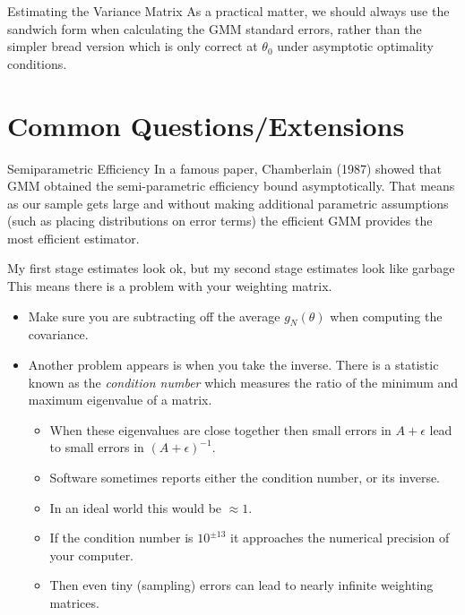 \documentclass[aspectratio=169]{beamer}
\begin{document}
\begin{frame}{Estimating the Variance Matrix}
 As a practical matter, we should always use the \alert{sandwich} form when calculating the GMM standard errors, rather than the simpler \alert{bread} version which is only correct at $\theta_0$ under asymptotic optimality conditions.
\end{frame}

\section*{\normalsize  Common Questions/Extensions}

\begin{frame}{Semiparametric Efficiency}
In a famous paper, Chamberlain (1987) showed that GMM obtained the semi-parametric efficiency bound asymptotically. That means as our sample gets large and without making additional parametric assumptions (such as placing distributions on error terms) the efficient GMM provides the most efficient estimator.
\end{frame}

\begin{frame}{My first stage estimates look ok, but my second stage estimates look like garbage}
This means there is a problem with your weighting matrix. 
\begin{itemize}
\item Make sure you are subtracting off the average $g_N(\theta)$ when computing the covariance. 
\item Another problem appears is when you take the inverse. There is a statistic known as the \textit{condition number} which measures the ratio of the minimum and maximum eigenvalue of a matrix.
\begin{itemize}
\item When these eigenvalues are close together then small errors in $A+\epsilon$ lead to small errors in $(A+\epsilon)^{-1}$.
\item Software sometimes reports either the condition number, or its inverse.
\item In an ideal world this would be $\approx 1$. 
\item If the condition number is $10^{\pm 13}$ it approaches the numerical precision of your computer. 
\item Then even tiny (sampling) errors can lead to nearly infinite weighting matrices.
\end{itemize}
\end{itemize}
\end{frame}
\end{document}
